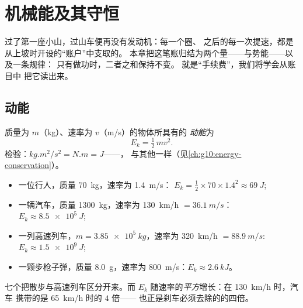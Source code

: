\chapter{机械能及其守恒}\label{ch:g11:mechanical-energy}

过了第一座小山，过山车便再没有发动机：每一个圈、
之后的每一次提速，都是从上坡时开设的“账户”中支取的。
本章把这笔账归结为两个量——与势能——以及一条规律：
只有做功时，二者之和保持不变。
就是“手续费”，我们将学会从账目中
把它读出来。

\section{动能}

\begin{definition}[动能]\label{def:g11:mechanical-energy:kinetic}
质量为 $m$（\unit{kg}）、速率为 $v$（\unit{m/s}）的物体所具有的
\emph{动能}为
\[
E_k = \tfrac12\, m v^2 .
\]
检验：$\unit{kg.m^2/s^2} = \unit{N.m} = \unit{J}$——，
与其他一样（见\cref{ch:g10:energy-conservation}）。
\end{definition}

\begin{example}[数量级]\label{ex:g11:mechanical-energy:orders}
\begin{itemize}
  \item 一位行人，质量 \qty{70}{kg}，速率为 \qty{1.4}{m/s}：
        $E_k = \tfrac12 \times 70 \times 1.4^2 \approx \qty{69}{J}$;
  \item 一辆汽车，质量 \qty{1300}{kg}，速率为 \qty{130}{km/h} $= \qty{36.1}{m/s}$：
        $E_k \approx \qty{8.5e5}{J}$;
  \item 一列高速列车，$m = \qty{3.85e5}{kg}$，速率为 \qty{320}{km/h}
        $= \qty{88.9}{m/s}$: $E_k \approx \qty{1.5e9}{J}$;
  \item 一颗步枪子弹，质量 \qty{8.0}{g}，速率为 \qty{800}{m/s}：$E_k \approx \qty{2.6}{kJ}$。
\end{itemize}
七个把散步与高速列车区分开来。而 $E_k$
随速率的\emph{平方}增长：在 \qty{130}{km/h} 时，汽车
携带的是 \qty{65}{km/h} 时的 $4$ 倍——
也正是刹车必须去除的的四倍。
\end{example}

